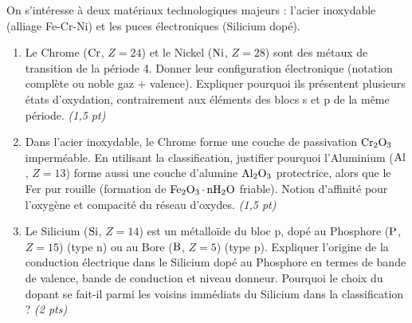\documentclass[11pt]{article}
\begin{document}
\begin{exercice}
On s'intéresse à deux matériaux technologiques majeurs : l'acier inoxydable (alliage Fe-Cr-Ni) et les puces électroniques (Silicium dopé).
\begin{enumerate}
    \item Le Chrome ($\ce{Cr}$, $Z=24$) et le Nickel ($\ce{Ni}$, $Z=28$) sont des métaux de transition de la période 4. Donner leur configuration électronique (notation complète ou noble gaz + valence). Expliquer pourquoi ils présentent plusieurs états d'oxydation, contrairement aux éléments des blocs s et p de la même période. \textit{(1,5 pt)}
    \item Dans l'acier inoxydable, le Chrome forme une couche de passivation $\ce{Cr2O3}$ imperméable. En utilisant la classification, justifier pourquoi l'Aluminium ($\ce{Al}$, $Z=13$) forme aussi une couche d'alumine $\ce{Al2O3}$ protectrice, alors que le Fer pur rouille (formation de $\ce{Fe2O3.nH2O}$ friable). Notion d'affinité pour l'oxygène et compacité du réseau d'oxydes. \textit{(1,5 pt)}
    \item Le Silicium ($\ce{Si}$, $Z=14$) est un métalloïde du bloc p, dopé au Phosphore ($\ce{P}$, $Z=15$) (type n) ou au Bore ($\ce{B}$, $Z=5$) (type p). Expliquer l'origine de la conduction électrique dans le Silicium dopé au Phosphore en termes de bande de valence, bande de conduction et niveau donneur. Pourquoi le choix du dopant se fait-il parmi les voisins immédiats du Silicium dans la classification ? \textit{(2 pts)}
\end{enumerate}
\end{exercice}
\end{document}
